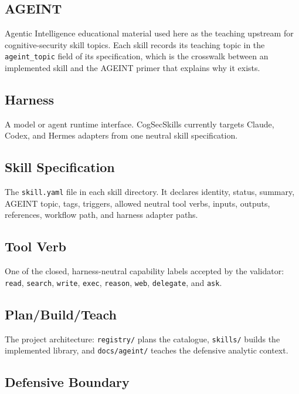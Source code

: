 \documentclass[
]{article}
\begin{document}
\subsection{AGEINT}\label{ageint}

Agentic Intelligence educational material used here as the teaching
upstream for cognitive-security skill topics. Each skill records its
teaching topic in the \texttt{ageint\_topic} field of its specification,
which is the crosswalk between an implemented skill and the AGEINT
primer that explains why it exists.

\subsection{Harness}\label{harness}

A model or agent runtime interface. CogSecSkills currently targets
Claude, Codex, and Hermes adapters from one neutral skill specification.

\subsection{Skill Specification}\label{skill-specification}

The \texttt{skill.yaml} file in each skill directory. It declares
identity, status, summary, AGEINT topic, tags, triggers, allowed neutral
tool verbs, inputs, outputs, references, workflow path, and harness
adapter paths.

\subsection{Tool Verb}\label{tool-verb}

One of the closed, harness-neutral capability labels accepted by the
validator: \texttt{read}, \texttt{search}, \texttt{write},
\texttt{exec}, \texttt{reason}, \texttt{web}, \texttt{delegate}, and
\texttt{ask}.

\subsection{Plan/Build/Teach}\label{planbuildteach}

The project architecture: \texttt{registry/} plans the catalogue,
\texttt{skills/} builds the implemented library, and
\texttt{docs/ageint/} teaches the defensive analytic context.

\subsection{Defensive Boundary}\label{defensive-boundary}
\end{document}

